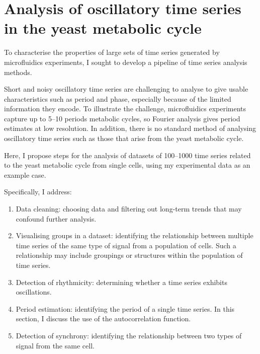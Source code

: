 
\chapter{Analysis of oscillatory time series in the yeast metabolic cycle}
\label{ch:analysis}

To characterise the properties of large sets of time series generated by microfluidics experiments, I sought to develop a pipeline of time series analysis methods.

Short and noisy oscillatory time series are challenging to analyse to give usable characteristics such as period and phase, especially because of the limited information they encode.
To illustrate the challenge, microfluidics experiments capture up to 5--10 periods metabolic cycles, so Fourier analysis gives period estimates at low resolution.
In addition, there is no standard method of analysing oscillatory time series such as those that arise from the yeast metabolic cycle.

Here, I propose steps for the analysis of datasets of 100--1000 time series related to the yeast metabolic cycle from single cells, using my experimental data as an example case.

Specifically, I address:
\begin{enumerate}
  \item Data cleaning: choosing data and filtering out long-term trends that may confound further analysis.
  \item Visualising groups in a dataset: identifying the relationship between multiple time series of the same type of signal from a population of cells.
        Such a relationship may include groupings or structures within the population of time series.
  \item Detection of rhythmicity: determining whether a time series exhibits oscillations.
  \item Period estimation: identifying the period of a single time series.
        In this section, I discuss the use of the autocorrelation function.
  \item Detection of synchrony: identifying the relationship between two types of signal from the same cell.
\end{enumerate}

